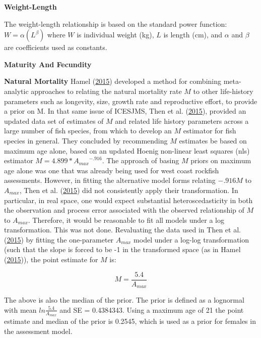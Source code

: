\documentclass[12pt,]{article}
\begin{document}
\textbf{Weight-Length}

The weight-length relationship is based on the standard power function:
\(W = \alpha(L^\beta)\) where \(W\) is individual weight (kg), \(L\) is
length (cm), and \(\alpha\) and \(\beta\) are coefficients used as
constants.

\vspace{.5cm}

\textbf{Maturity And Fecundity}

\vspace{.5cm}

\textbf{Natural Mortality} Hamel
(\protect\hyperlink{ref-Hamel2015}{2015}) developed a method for
combining meta-analytic approaches to relating the natural mortality
rate \(M\) to other life-history parameters such as longevity, size,
growth rate and reproductive effort, to provide a prior on M. In that
same issue of ICESJMS, Then et al.
(\protect\hyperlink{ref-Then2015}{2015}), provided an updated data set
of estimates of \(M\) and related life history parameters across a large
number of fish species, from which to develop an \(M\) estimator for
fish species in general. They concluded by recommending \(M\) estimates
be based on maximum age alone, based on an updated Hoenig non-linear
least squares (nls) estimator \(M= 4.899*{A_{max}}^{-.916}\). The
approach of basing \(M\) priors on maximum age alone was one that was
already being used for west coast rockfish assessments. However, in
fitting the alternative model forms relating \(-.916M\) to \(A_{max}\),
Then et al. (\protect\hyperlink{ref-Then2015}{2015}) did not
consistently apply their transformation. In particular, in real space,
one would expect substantial heteroscedasticity in both the observation
and process error associated with the observed relationship of \(M\) to
\(A_{max}\). Therefore, it would be reasonable to fit all models under a
log transformation. This was not done. Revaluating the data used in Then
et al. (\protect\hyperlink{ref-Then2015}{2015}) by fitting the
one-parameter \(A_{max}\) model under a log-log transformation (such
that the slope is forced to be -1 in the transformed space (as in Hamel
(\protect\hyperlink{ref-Hamel2015}{2015})), the point estimate for \(M\)
is:

\begin{equation}
M = \frac{5.4}{A_{max}}
\end{equation}

The above is also the median of the prior. The prior is defined as a
lognormal with mean \(ln\frac{5.4}{A_{max}}\) and SE = 0.4384343. Using
a maximum age of 21 the point estimate and median of the prior is
0.2545, which is used as a prior for females in the assessment model.
\end{document}
